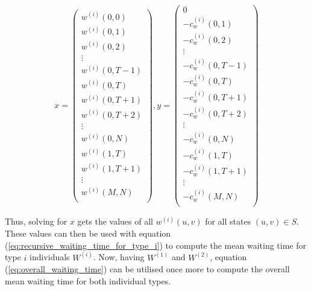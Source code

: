 \begin{equation}
    x =
    \begin{pmatrix}
        w^{(i)}(0, 0) \\
        w^{(i)}(0, 1) \\
        w^{(i)}(0, 2) \\
        \vdots \\
        w^{(i)}(0, T-1) \\
        w^{(i)}(0, T) \\
        w^{(i)}(0, T + 1) \\
        w^{(i)}(0, T + 2) \\
        \vdots \\
        w^{(i)}(0, N) \\
        w^{(i)}(1, T) \\
        w^{(i)}(1, T + 1) \\
        \vdots \\
        w^{(i)}(M, N) \\
    \end{pmatrix},
    y=
    \begin{pmatrix}
        0 \\ %
        -c^{(i)}_w(0,1) \\ %
        -c^{(i)}_w(0,2) \\ %
        \vdots \\
        -c^{(i)}_w(0,T - 1) \\ %
        -c^{(i)}_w(0,T) \\ %
        -c^{(i)}_w(0,T+1) \\
        -c^{(i)}_w(0,T+2) \\
        \vdots \\
        -c^{(i)}_w(0,N) \\
        -c^{(i)}_w(1,T) \\
        -c^{(i)}_w(1,T+1) \\
        \vdots \\
        -c^{(i)}_w(M,N) \\
    \end{pmatrix}
\end{equation}

Thus, solving for \(x\) gets the values of all \(w^{(i)}(u,v)\) for all states
\((u,v) \in S\).
These values can then be used with equation
(\ref{eq:recursive_waiting_time_for_type_i}) to compute the mean waiting time
for type \(i\) individuals \(W^{(i)}\).
Now, having \(W^{(1)}\) and \(W^{(2)}\), equation (\ref{eq:overall_waiting_time})
can be utilised once more to compute the overall mean waiting time for both
individual types.


